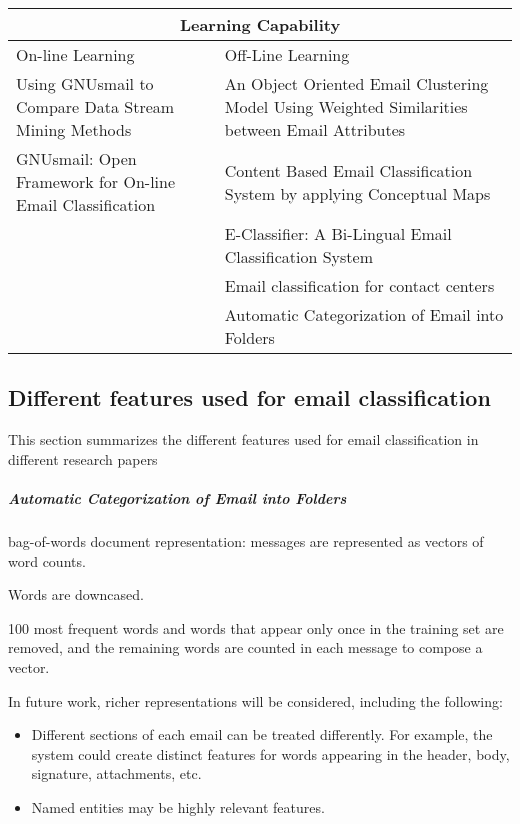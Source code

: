 \begin{center}
\begin{tabular}{|p{6cm}|p{6cm}|}
\hline
\multicolumn{2}{|c|}{Learning Capability} \\
\hline
On-line Learning & Off-Line Learning 
\\ \hline
Using GNUsmail to Compare Data Stream Mining Methods \cite{JOSE11} &
An Object Oriented Email Clustering Model Using  Weighted Similarities 
between Email Attributes \cite{NARESH10}
\\ \hline

GNUsmail: Open Framework for On-line Email Classification \cite{MANUEL11}
& Content Based Email Classification System by applying Conceptual Maps \cite{BASKARAN09}
\\ \hline

& E-Classifier: A Bi-Lingual Email Classification System \cite{NOUF08}
\\ \hline

& Email classification for contact centers \cite{ANI03}
\\ \hline

& 
Automatic Categorization of Email into Folders \cite{RON04}

\\ \hline

\end{tabular}
\end{center}

\newpage


\subsection{Different features used for email classification}
This section summarizes the different features used for email classification in different research papers
    \subparagraph{Automatic Categorization of Email into Folders \cite{RON04}}
	\begin{my_itemize}
		\item bag-of-words document representation: messages are represented as vectors of word counts.
		\item Words are downcased.
		\item 100 most frequent words and words that appear only once in the training set are removed, and the remaining words are counted in each message to compose a vector.
		\item In future work, richer representations will be considered, including the following:
			\begin{itemize}
				\item Different sections of each email can be treated differently. For example, the system could create distinct features for words appearing in the header, body, signature, attachments, etc.
				\item Named entities may be highly relevant features.
			\end{itemize}
	\end{my_itemize}

